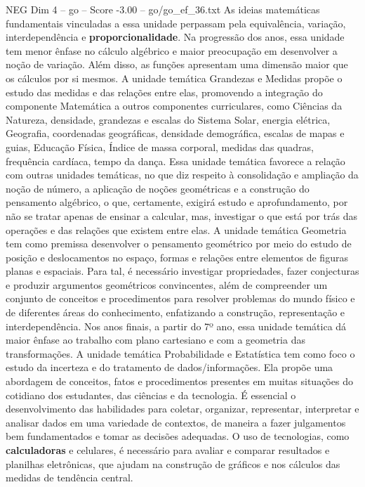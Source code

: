 \begin{textsample}{NEG Dim 4 – go – Score -3.00 – go/go\_ef\_36.txt}
As ideias matemáticas fundamentais vinculadas a essa unidade perpassam pela equivalência, variação, interdependência e \textbf{proporcionalidade}.
Na progressão dos anos, essa unidade tem menor ênfase no cálculo algébrico e maior preocupação em desenvolver a noção de variação.
Além disso, as funções apresentam uma dimensão maior que os cálculos por si mesmos.
A unidade temática Grandezas e Medidas propõe o estudo das medidas e das relações entre elas, promovendo a integração do componente Matemática a outros componentes curriculares, como Ciências da Natureza, densidade, grandezas e escalas do Sistema Solar, energia elétrica, Geografia, coordenadas geográficas, densidade demográfica, escalas de mapas e guias, Educação Física, Índice de massa corporal, medidas das quadras, frequência cardíaca, tempo da dança.
Essa unidade temática favorece a relação com outras unidades temáticas, no que diz respeito à consolidação e ampliação da noção de número, a aplicação de noções geométricas e a construção do pensamento algébrico, o que, certamente, exigirá estudo e aprofundamento, por não se tratar apenas de ensinar a calcular, mas, investigar o que está por trás das operações e das relações que existem entre elas.
A unidade temática Geometria tem como premissa desenvolver o pensamento geométrico por meio do estudo de posição e deslocamentos no espaço, formas e relações entre elementos de figuras planas e espaciais.
Para tal, é necessário investigar propriedades, fazer conjecturas e produzir argumentos geométricos convincentes, além de compreender um conjunto de conceitos e procedimentos para resolver problemas do mundo físico e de diferentes áreas do conhecimento, enfatizando a construção, representação e interdependência.
Nos anos finais, a partir do 7º ano, essa unidade temática dá maior ênfase ao trabalho com plano cartesiano e com a geometria das transformações.
A unidade temática Probabilidade e Estatística tem como foco o estudo da incerteza e do tratamento de dados/informações.
Ela propõe uma abordagem de conceitos, fatos e procedimentos presentes em muitas situações do cotidiano dos estudantes, das ciências e da tecnologia.
É essencial o desenvolvimento das habilidades para coletar, organizar, representar, interpretar e analisar dados em uma variedade de contextos, de maneira a fazer julgamentos bem fundamentados e tomar as decisões adequadas.
O uso de tecnologias, como \textbf{calculadoras} e celulares, é necessário para avaliar e comparar resultados e planilhas eletrônicas, que ajudam na construção de gráficos e nos cálculos das medidas de tendência central.

\end{textsample}
